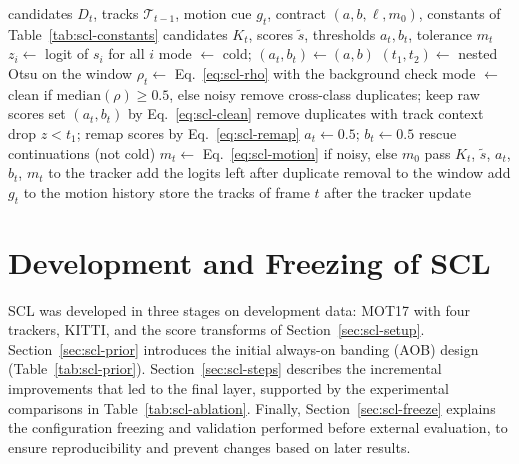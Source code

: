 \begin{algorithm}[tbp]
\caption{SCL for frame $t$; the comments name the steps of Fig.~\ref{fig:scl-arch}. The window holds the logits of frames $t-W$ to $t-1$, so the decision for frame $t$ uses no future frame.}\label{alg:scl-layer}
\begin{algorithmic}[1]
\Require candidates $D_t$, tracks $\mathcal{T}_{t-1}$, motion cue $g_t$, contract $(a,b,\ell,m_0)$, constants of Table~\ref{tab:scl-constants}
\Ensure candidates $K_t$, scores $\tilde{s}$, thresholds $a_t,b_t$, tolerance $m_t$
\State $z_i\gets$ logit of $s_i$ for all $i$ 
 
  \State mode $\gets$ cold; $(a_t,b_t)\gets(a,b)$
\Else
  \State $(t_1,t_2)\gets$ nested Otsu on the window 
  \State $\rho_t\gets$ Eq.~\eqref{eq:scl-rho} with the background check
  \State mode $\gets$ clean if $\mathrm{median}(\rho)\ge0.5$, else noisy 
\EndIf
{} 
  \State remove cross-class duplicates; keep raw scores
   set $(a_t,b_t)$ by Eq.~\eqref{eq:scl-clean}
  \EndIf
\Else {}
  \State remove duplicates with track context
  \State drop $z<t_1$; remap scores by Eq.~\eqref{eq:scl-remap}
  \State $a_t\gets0.5$; $b_t\gets0.5$
\EndIf
\State rescue continuations (not cold) 
\State $m_t\gets$ Eq.~\eqref{eq:scl-motion} if noisy, else $m_0$ 
\State pass $K_t$, $\tilde{s}$, $a_t$, $b_t$, $m_t$ to the tracker
\State add the logits left after duplicate removal to the window
\State add $g_t$ to the motion history
\State store the tracks of frame $t$ after the tracker update
\end{algorithmic}
\end{algorithm}

\section{Development and Freezing of SCL}\label{sec:scl-dev}
SCL was developed in three stages on development data: MOT17 with four trackers, KITTI, and the score transforms of Section~\ref{sec:scl-setup}. Section~\ref{sec:scl-prior} introduces the initial always-on banding (AOB) design (Table~\ref{tab:scl-prior}). Section~\ref{sec:scl-steps} describes the incremental improvements that led to the final layer, supported by the experimental comparisons in Table~\ref{tab:scl-ablation}. Finally, Section~\ref{sec:scl-freeze} explains the configuration freezing and validation performed before external evaluation, to ensure reproducibility and prevent changes based on later results.

